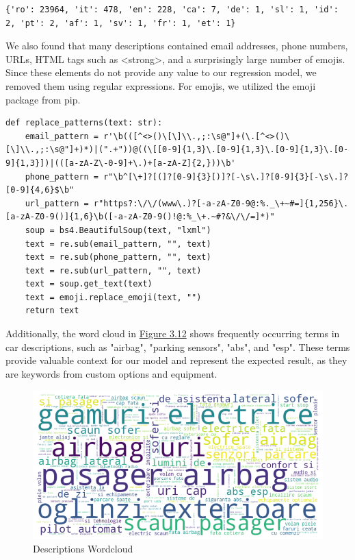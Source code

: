 \begin{lstlisting}[label={lst:langs}]
{'ro': 23964, 'it': 478, 'en': 228, 'ca': 7, 'de': 1, 'sl': 1, 'id': 2, 'pt': 2, 'af': 1, 'sv': 1, 'fr': 1, 'et': 1}
\end{lstlisting}

We also found that many descriptions contained email addresses, phone numbers, URLs, HTML tags such as <strong>, and a surprisingly large number of emojis. Since these elements do not provide any value to our regression model, we removed them using regular expressions. For emojis, we utilized the emoji \cite{emoji} package from pip.

\begin{listing}[H]
\begin{lstlisting}
def replace_patterns(text: str):
    email_pattern = r'\b(([^<>()\[\]\\.,;:\s@"]+(\.[^<>()\[\]\\.,;:\s@"]+)*)|(".+"))@((\[[0-9]{1,3}\.[0-9]{1,3}\.[0-9]{1,3}\.[0-9]{1,3}])|(([a-zA-Z\-0-9]+\.)+[a-zA-Z]{2,}))\b'
    phone_pattern = r"\b^[\+]?[(]?[0-9]{3}[)]?[-\s\.]?[0-9]{3}[-\s\.]?[0-9]{4,6}$\b"
    url_pattern = r"https?:\/\/(www\.)?[-a-zA-Z0-9@:%._\+~#=]{1,256}\.[a-zA-Z0-9()]{1,6}\b([-a-zA-Z0-9()!@:%_\+.~#?&\/\/=]*)"
    soup = bs4.BeautifulSoup(text, "lxml")
    text = re.sub(email_pattern, "", text)
    text = re.sub(phone_pattern, "", text)
    text = re.sub(url_pattern, "", text)
    text = soup.get_text(text)
    text = emoji.replace_emoji(text, "")
    return text
\end{lstlisting}
\end{listing}

Additionally, the word cloud in \hyperref[fig:wordcloud]{Figure 3.12} shows frequently occurring terms in car descriptions, such as "airbag", "parking sensors", "abs", and "esp". These terms provide valuable context for our model and represent the expected result, as they are keywords from custom options and equipment.

\begin{figure}[ht]
    \centering
    \includegraphics[width=\linewidth]{images/priceprediction/data/wordcloud.png}
    \caption{Descriptions Wordcloud}
    \label{fig:wordcloud}
\end{figure}


